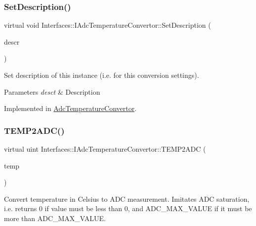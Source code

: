 \subsubsection{\texorpdfstring{Set\+Description()}{SetDescription()}}
{\footnotesize\ttfamily virtual void Interfaces\+::\+I\+Adc\+Temperature\+Convertor\+::\+Set\+Description (\begin{DoxyParamCaption}\item[{Q\+String}]{descr }\end{DoxyParamCaption})\hspace{0.3cm}{\ttfamily [pure virtual]}}



Set description of this instance (i.\+e. for this conversion settings). 


\begin{DoxyParams}{Parameters}
{\em desct} & Description \\
\hline
\end{DoxyParams}


Implemented in \hyperlink{class_adc_temperature_convertor_a56103443d7da4769339ddb685a0a8df0}{Adc\+Temperature\+Convertor}.

\mbox{\label{class_interfaces_1_1_i_adc_temperature_convertor_ab5d3453ecc41848b723a790fe7e01f79}} 
\subsubsection{\texorpdfstring{T\+E\+M\+P2\+A\+D\+C()}{TEMP2ADC()}}
{\footnotesize\ttfamily virtual uint Interfaces\+::\+I\+Adc\+Temperature\+Convertor\+::\+T\+E\+M\+P2\+A\+DC (\begin{DoxyParamCaption}\item[{double}]{temp }\end{DoxyParamCaption})\hspace{0.3cm}{\ttfamily [pure virtual]}}



Convert temperature in Celsius to A\+DC measurement. Imitates A\+DC saturation, i.\+e. returns 0 if value must be less than 0, and A\+D\+C\+\_\+\+M\+A\+X\+\_\+\+V\+A\+L\+UE if it must be more than A\+D\+C\+\_\+\+M\+A\+X\+\_\+\+V\+A\+L\+UE. 


